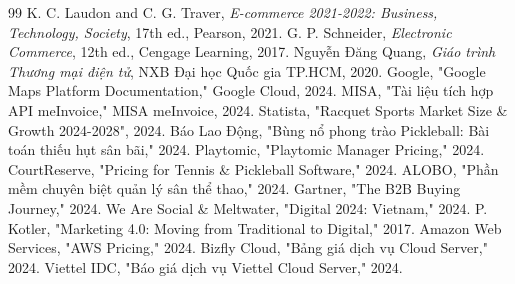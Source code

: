 
\renewcommand{\refname}{Tài liệu tham khảo}
\begin{thebibliography}{99}
     K. C. Laudon and C. G. Traver, \textit{E-commerce 2021-2022: Business, Technology, Society}, 17th ed., Pearson, 2021.
     G. P. Schneider, \textit{Electronic Commerce}, 12th ed., Cengage Learning, 2017.
     Nguyễn Đăng Quang, \textit{Giáo trình Thương mại điện tử}, NXB Đại học Quốc gia TP.HCM, 2020.
     Google, "Google Maps Platform Documentation," Google Cloud, 2024.
     MISA, "Tài liệu tích hợp API meInvoice," MISA meInvoice, 2024.
     Statista, "Racquet Sports Market Size \& Growth 2024-2028", 2024.
     Báo Lao Động, "Bùng nổ phong trào Pickleball: Bài toán thiếu hụt sân bãi," 2024.
     Playtomic, "Playtomic Manager Pricing," 2024.
     CourtReserve, "Pricing for Tennis \& Pickleball Software," 2024.
     ALOBO, "Phần mềm chuyên biệt quản lý sân thể thao," 2024.
     Gartner, "The B2B Buying Journey," 2024.
     We Are Social \& Meltwater, "Digital 2024: Vietnam," 2024.
     P. Kotler, "Marketing 4.0: Moving from Traditional to Digital," 2017.
     Amazon Web Services, "AWS Pricing," 2024.
     Bizfly Cloud, "Bảng giá dịch vụ Cloud Server," 2024.
     Viettel IDC, "Báo giá dịch vụ Viettel Cloud Server," 2024.
\end{thebibliography}